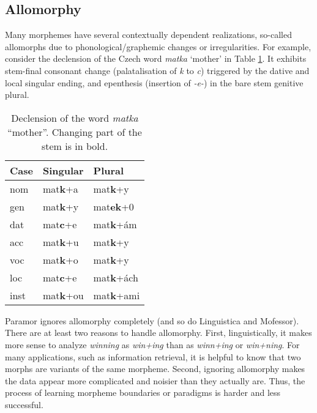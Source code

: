 \documentclass{itatnew}
\newcommand{\gloss}[2]{\emph{#1} ``#2''}
\newcommand{\e}[1]{\textit{#1}} %
\begin{document}

\subsection{Allomorphy}


\noindent
Many morphemes have several contextually dependent realizations,  so-called
allomorphs due to phonological/graphemic changes or irregularities. For example, consider the declension of the Czech word \e{matka} `mother' in Table \ref{table:matka}. It exhibits stem-final conso\-nant chan\-ge (palatalisation of \e{k} to \e{c}) triggered by the dative and local singular ending, and epenthesis (insertion of \e{-e-}) in the bare stem genitive plural.

\begin{table}[h]
\begin{center}
\begin{tabular}{|l|ll|}
\hline \bf Case & \bf Singular & \bf Plural \\ \hline
nom & mat\textbf{k}+a & mat\textbf{k}+y \\
gen & mat\textbf{k}+y & mat\textbf{ek}+0 \\
dat & mat\textbf{c}+e & mat\textbf{k}+ám\\
acc & mat\textbf{k}+u & mat\textbf{k}+y \\
voc & mat\textbf{k}+o & mat\textbf{k}+y \\
loc & mat\textbf{c}+e & mat\textbf{k}+ách \\
inst & mat\textbf{k}+ou & mat\textbf{k}+ami \\
\hline
\end{tabular}
\end{center}
\caption{\label{table:matka} Declension of the word \gloss{matka}{mother}. Changing part of the stem is in bold.}
\end{table}


Paramor ignores allomorphy completely (and so do Linguistica and Mofessor).
%
There are at least two reasons to handle allomorphy.
%
First, linguistically,
it  makes  more  sense  to  analyze  \e{winning}  as  \e{win+ing} than as  \e{winn+ing} or \e{win+ning}. For  many  applications, such as information retrieval, it is helpful to know that two morphs are variants of the same morpheme.
%
Second, ignoring allomorphy makes the data appear more complicated and noisier than they actually are. Thus, the process of learning morpheme boundaries or paradigms is harder and less successful.
\end{document}
